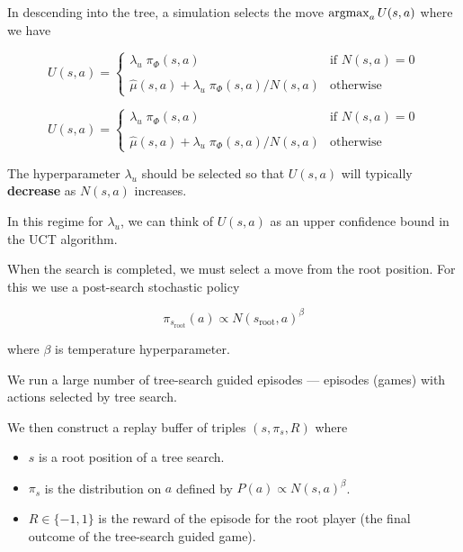 {

In descending into the tree, a simulation selects the move $\operatorname*{argmax}_a U(s,a)$ where we have

\vfill
$$U(s,a) =  \left\{\begin{array}{ll}\lambda_u \;\pi_\Phi(s,a) &\mbox{if $N(s,a) = 0$} \\  \\ \hat{\mu}(s,a) + \lambda_u\; \pi_\Phi(s,a)/N(s,a) & \mbox{otherwise} \end{array}\right.$$

$$U(s,a) =  \left\{\begin{array}{ll}\lambda_u \; \pi_\Phi(s,a) &\mbox{if $N(s,a) = 0$} \\ \\ \hat{\mu}(s,a) + \lambda_u\; \pi_\Phi(s,a)/N(s,a) & \mbox{otherwise} \end{array}\right.$$

\vfill
The hyperparameter $\lambda_u$ should be selected so that $U(s,a)$ will typically {\bf decrease} as $N(s,a)$ increases.

\vfill
In this regime for $\lambda_u$, we can think of $U(s,a)$ as an upper confidence bound in the UCT algorithm.


When the search is completed, we must select a move from the root position.  For this we use a post-search stochastic policy

\vfill
$$\pi_{s_{\mathrm{root}}}(a) \propto N(s_{\mathrm{root}},a)^\beta$$

\vfill
where $\beta$ is temperature hyperparameter.


We run a large number of tree-search guided episodes  --- episodes (games) with actions selected by tree search.

\vfill
We then construct a replay buffer of triples $(s,\pi_{s},R)$ where

\vfill
\begin{itemize}
\item $s$ is a root position of a tree search.

\vfill
\item $\pi_{s}$ is the distribution on $a$ defined by $P(a) \propto N(s,a)^\beta$.

\vfill
\item $R \in \{-1,1\}$ is the reward of the episode for the root player (the final outcome of the tree-search guided game).
\end{itemize}

}

